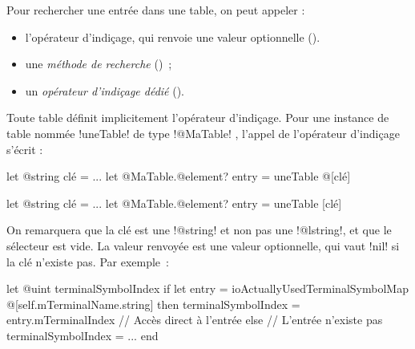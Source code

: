
Pour rechercher une entrée dans une table, on peut appeler :
\begin{itemize}
  \item l'opérateur d'indiçage, qui renvoie une valeur optionnelle ().
  \item une \emph{méthode de recherche} ()~;
  \item un \emph{opérateur d'indiçage dédié} ().
\end{itemize}










Toute table définit implicitement l'opérateur d'indiçage. Pour une instance de table nommée \ggst!uneTable! de type \ggst!@MaTable! , l'appel de l'opérateur d'indiçage s'écrit :

\begin{galgas3}
let @string clé = ...
let @MaTable.@element? entry = uneTable @[clé]
\end{galgas3}

\begin{galgas4}
let @string clé = ...
let @MaTable.@element? entry = uneTable [clé]
\end{galgas4}

On remarquera que la clé est une \ggsq!@string! et non pas une \ggsq!@lstring!, et que le sélecteur est vide. La valeur renvoyée est une valeur optionnelle, qui vaut \ggsq!nil! si la clé n'existe pas. Par exemple~:

%
%

\begin{galgas3}
let @uint terminalSymbolIndex
if let entry = ioActuallyUsedTerminalSymbolMap @[self.mTerminalName.string] then
  terminalSymbolIndex = entry.mTerminalIndex // Accès direct à l'entrée
else // L'entrée n'existe pas
  terminalSymbolIndex = ...
end
\end{galgas3}



